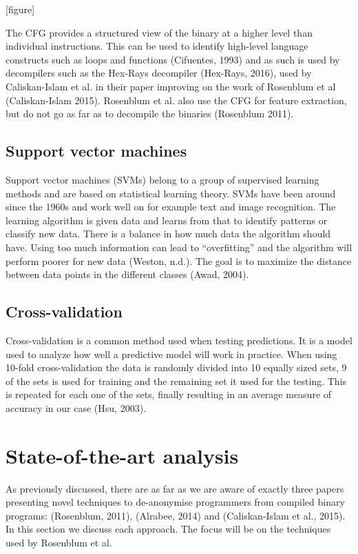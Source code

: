 \documentclass[a4paper,11pt]{kth-mag}
\begin{document}
[figure]

The CFG provides a structured view of the binary at a higher level than
individual instructions. This can be used to identify high-level language
constructs such as loops and functions (Cifuentes, 1993) and as such is used by
decompilers such as the Hex-Rays decompiler (Hex-Rays, 2016), used by
Caliskan-Islam et al. in their paper improving on the work of Rosenblum et al
(Caliskan-Islam 2015). Rosenblum et al. also use the CFG for feature
extraction, but do not go as far as to decompile the binaries (Rosenblum 2011).

\subsection{Support vector machines}
Support vector machines (SVMs) belong to a group of supervised learning methods
and are based on statistical learning theory. SVMs have been around since the
1960s and work well on for example text and image recognition. The learning
algorithm is given data and learns from that to identify patterns or classify
new data. There is a balance in how much data the algorithm should have. Using
too much information can lead to “overfitting” and the algorithm will perform
poorer for new data (Weston, n.d.). The goal is to maximize the distance
between data points in the different classes (Awad, 2004).

\subsection{Cross-validation}
Cross-validation is a common method used when testing predictions. It is a
model used to analyze how well a predictive model will work in practice. When
using 10-fold cross-validation the data is randomly divided into 10 equally
sized sets, 9 of the sets is used for training and the remaining set it used
for the testing. This is repeated for each one of the sets, finally resulting
in an average measure of accuracy in our case (Hsu, 2003).        

\section{State-of-the-art analysis}
As previously discussed, there are as far as we are aware of exactly three
papers presenting novel techniques to de-anonymise programmers from compiled
binary programs: (Rosenblum, 2011), (Alrabee, 2014) and (Caliskan-Islam et al.,
2015). In this section we discuss each approach. The  focus will be on the
techniques used by Rosenblum et al.
\end{document}
